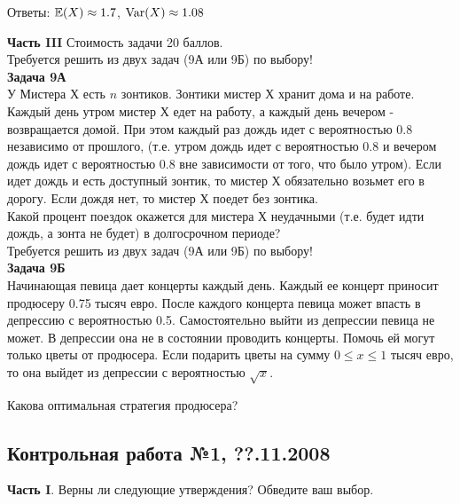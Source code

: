 \documentclass[12pt, a4paper]{article}\usepackage[]{graphicx}\usepackage[]{color}
\begin{document}
Ответы: $\mathbb{E}(X)\approx 1.7$, $\operatorname{Var}(X)\approx 1.08$


\textbf{Часть III} Стоимость задачи 20 баллов. \\

Требуется решить \textbf{} из двух задач (9А или 9Б) по
выбору! \\

\textbf{Задача 9А} \\
У Мистера Х есть $n$ зонтиков. Зонтики мистер Х хранит дома и на работе. Каждый день утром мистер Х едет на работу, а каждый день вечером - возвращается домой. При этом каждый раз дождь идет с вероятностью 0.8 независимо от прошлого, (т.е. утром дождь идет с вероятностью 0.8 и вечером дождь идет с вероятностью 0.8 вне зависимости от того, что было утром). Если идет дождь и есть доступный зонтик, то мистер Х обязательно возьмет его в дорогу. Если дождя нет, то мистер Х поедет без зонтика. \\
Какой процент поездок окажется для мистера Х неудачными (т.е. будет идти дождь, а зонта не будет) в долгосрочном периоде? \\

Требуется решить \textbf{} из двух задач (9А или 9Б) по
выбору! \\

\textbf{Задача 9Б} \\
Начинающая певица дает концерты каждый день. Каждый ее концерт приносит продюсеру 0.75 тысяч евро. После каждого концерта певица может впасть в депрессию с вероятностью 0.5. Самостоятельно выйти из депрессии певица не может. В депрессии она не в состоянии проводить концерты. Помочь ей могут только цветы от продюсера. Если подарить цветы на сумму $0\le x\le 1$ тысяч евро, то она выйдет из депрессии с вероятностью $\sqrt{x}$.

Какова оптимальная стратегия продюсера?


\subsection{Контрольная работа №1, ??.11.2008}

\textbf{Часть I}. Верны ли следующие утверждения? Обведите ваш выбор. \\
\end{document}
